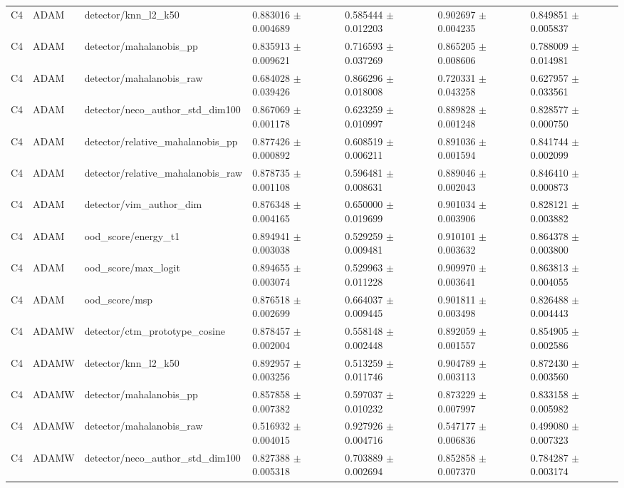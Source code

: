 \begin{longtable}{lllllll}
C4 & ADAM & detector/knn\_l2\_k50 & 0.883016 $\pm$ 0.004689 & 0.585444 $\pm$ 0.012203 & 0.902697 $\pm$ 0.004235 & 0.849851 $\pm$ 0.005837 \\
C4 & ADAM & detector/mahalanobis\_pp & 0.835913 $\pm$ 0.009621 & 0.716593 $\pm$ 0.037269 & 0.865205 $\pm$ 0.008606 & 0.788009 $\pm$ 0.014981 \\
C4 & ADAM & detector/mahalanobis\_raw & 0.684028 $\pm$ 0.039426 & 0.866296 $\pm$ 0.018008 & 0.720331 $\pm$ 0.043258 & 0.627957 $\pm$ 0.033561 \\
C4 & ADAM & detector/neco\_author\_std\_dim100 & 0.867069 $\pm$ 0.001178 & 0.623259 $\pm$ 0.010997 & 0.889828 $\pm$ 0.001248 & 0.828577 $\pm$ 0.000750 \\
C4 & ADAM & detector/relative\_mahalanobis\_pp & 0.877426 $\pm$ 0.000892 & 0.608519 $\pm$ 0.006211 & 0.891036 $\pm$ 0.001594 & 0.841744 $\pm$ 0.002099 \\
C4 & ADAM & detector/relative\_mahalanobis\_raw & 0.878735 $\pm$ 0.001108 & 0.596481 $\pm$ 0.008631 & 0.889046 $\pm$ 0.002043 & 0.846410 $\pm$ 0.000873 \\
C4 & ADAM & detector/vim\_author\_dim & 0.876348 $\pm$ 0.004165 & 0.650000 $\pm$ 0.019699 & 0.901034 $\pm$ 0.003906 & 0.828121 $\pm$ 0.003882 \\
C4 & ADAM & ood\_score/energy\_t1 & 0.894941 $\pm$ 0.003038 & 0.529259 $\pm$ 0.009481 & 0.910101 $\pm$ 0.003632 & 0.864378 $\pm$ 0.003800 \\
C4 & ADAM & ood\_score/max\_logit & 0.894655 $\pm$ 0.003074 & 0.529963 $\pm$ 0.011228 & 0.909970 $\pm$ 0.003641 & 0.863813 $\pm$ 0.004055 \\
C4 & ADAM & ood\_score/msp & 0.876518 $\pm$ 0.002699 & 0.664037 $\pm$ 0.009445 & 0.901811 $\pm$ 0.003498 & 0.826488 $\pm$ 0.004443 \\
C4 & ADAMW & detector/ctm\_prototype\_cosine & 0.878457 $\pm$ 0.002004 & 0.558148 $\pm$ 0.002448 & 0.892059 $\pm$ 0.001557 & 0.854905 $\pm$ 0.002586 \\
C4 & ADAMW & detector/knn\_l2\_k50 & 0.892957 $\pm$ 0.003256 & 0.513259 $\pm$ 0.011746 & 0.904789 $\pm$ 0.003113 & 0.872430 $\pm$ 0.003560 \\
C4 & ADAMW & detector/mahalanobis\_pp & 0.857858 $\pm$ 0.007382 & 0.597037 $\pm$ 0.010232 & 0.873229 $\pm$ 0.007997 & 0.833158 $\pm$ 0.005982 \\
C4 & ADAMW & detector/mahalanobis\_raw & 0.516932 $\pm$ 0.004015 & 0.927926 $\pm$ 0.004716 & 0.547177 $\pm$ 0.006836 & 0.499080 $\pm$ 0.007323 \\
C4 & ADAMW & detector/neco\_author\_std\_dim100 & 0.827388 $\pm$ 0.005318 & 0.703889 $\pm$ 0.002694 & 0.852858 $\pm$ 0.007370 & 0.784287 $\pm$ 0.003174 \\

\end{longtable}
